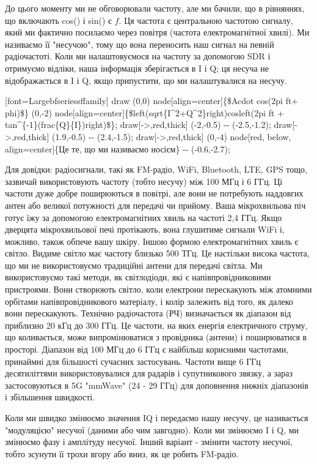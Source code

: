 До цього моменту ми не обговорювали частоту, але ми бачили, що в
рівняннях, що включають cos() і sin() є \(f\). Ця частота є центральною
частотою сигналу, який ми фактично посилаємо через повітря (частота
електромагнітної хвилі). Ми називаємо її "несучою", тому що вона
переносить наш сигнал на певній радіочастоті. Коли ми налаштовуємося на
частоту за допомогою SDR і отримуємо відліки, наша інформація
зберігається в I і Q; ця несуча не відображається в I і Q, якщо
припустити, що ми налаштувалися на несучу.

{[}font=Largebfseriessffamily{]} draw (0,0)
node{[}align=center{]}\{\$Acdot cos(2pi ft+ phi)\$\} (0,-2)
node{[}align=center{]}\{\$left(sqrt\{I\^{}2+Q\^{}2\}right)cosleft(2pi ft
+ tan\^{}\{-1\}(frac\{Q\}\{I\})right)\$\};
draw{[}-\textgreater,red,thick{]} (-2,-0.5) -\/- (-2.5,-1.2);
draw{[}-\textgreater,red,thick{]} (1.9,-0.5) -\/- (2.4,-1.5);
draw{[}-\textgreater,red,thick{]} (0,-4) node{[}red, below,
align=center{]}\{Це те, що ми називаємо носієм\} -\/- (-0.6,-2.7);

Для довідки: радіосигнали, такі як FM-радіо, WiFi, Bluetooth, LTE, GPS
тощо, зазвичай використовують частоту (тобто несучу) між 100 МГц і 6
ГГц. Ці частоти дуже добре поширюються в повітрі, але вони не потребують
наддовгих антен або великої потужності для передачі чи прийому. Ваша
мікрохвильова піч готує їжу за допомогою електромагнітних хвиль на
частоті 2,4 ГГц. Якщо дверцята мікрохвильової печі протікають, вона
глушитиме сигнали WiFi і, можливо, також обпече вашу шкіру. Іншою формою
електромагнітних хвиль є світло. Видиме світло має частоту близько 500
ТГц. Це настільки висока частота, що ми не використовуємо традиційні
антени для передачі світла. Ми використовуємо такі методи, як
світлодіоди, які є напівпровідниковими пристроями. Вони створюють
світло, коли електрони перескакують між атомними орбітами
напівпровідникового матеріалу, і колір залежить від того, як далеко вони
перескакують. Технічно радіочастота (РЧ) визначається як діапазон від
приблизно 20 кГц до 300 ГГц. Це частоти, на яких енергія електричного
струму, що коливається, може випромінюватися з провідника (антени) і
поширюватися в просторі. Діапазон від 100 МГц до 6 ГГц є найбільш
корисними частотами, принаймні для більшості сучасних застосувань.
Частоти вище 6 ГГц десятиліттями використовувалися для радарів і
супутникового зв\textquotesingle язку, а зараз застосовуються в 5G
"mmWave" (24 - 29 ГГц) для доповнення нижніх діапазонів і збільшення
швидкості.

Коли ми швидко змінюємо значення IQ і передаємо нашу несучу, це
називається "модуляцією" несучої (даними або чим завгодно). Коли ми
змінюємо I і Q, ми змінюємо фазу і амплітуду несучої. Інший варіант -
змінити частоту несучої, тобто зсунути її трохи вгору або вниз, як це
робить FM-радіо.

